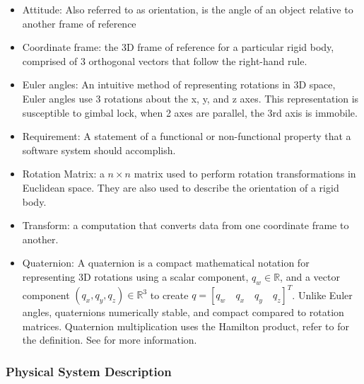 \documentclass[12pt]{article}
\begin{document}
\begin{itemize}

\item Attitude: Also referred to as orientation, is the angle of an object relative to another frame
of reference
\item Coordinate frame: the 3D frame of reference for a particular rigid body, comprised of 3
orthogonal vectors that follow the right-hand rule.
\item Euler angles: An intuitive method of representing rotations in 3D space, Euler angles use 3
rotations about the x, y, and z axes. This representation is susceptible to gimbal lock, when 2 axes
are parallel, the 3rd axis is immobile.
\item Requirement: A statement of a functional or non-functional property that a software system
should accomplish.
\item Rotation Matrix: a $n \times n$ matrix used to perform rotation transformations in Euclidean
space. They are also used to describe the orientation of a rigid body.
\item Transform: a computation that converts data from one coordinate frame to another.
\item Quaternion: A quaternion is a compact mathematical notation for representing 3D rotations
using a scalar component, $q_w \in \mathbb{R}$, and a vector component $(q_x, q_y, q_z) \in
\mathbb{R}^3$ to create $q = [q_w \quad q_x \quad q_y \quad q_z]^T$. Unlike Euler angles,
quaternions numerically stable, and compact compared to rotation matrices. Quaternion multiplication
uses the Hamilton product, refer to \cite{hamilton} for the definition. See \cite{quat} for more
information.
\end{itemize}

\subsubsection{Physical System Description} \label{sec_phySystDescrip}

\end{document}
